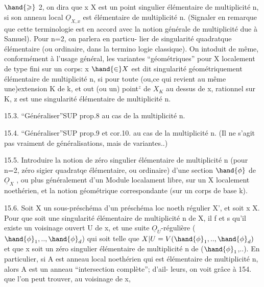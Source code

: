 
$\hand{\geqslant}$ 2, on dira que x \hand{$\in$} X est un point singulier élémentaire de multiplicité
n, si son anneau local $\underline{O}_{X,x}$ est élémentaire de multiplicité n. (Signaler
en remarque que cette  terminologie est en accord avec la notion
générale de multiplicité due à Samuel). Pour n=2, on parlera en particu-%
lier de singularité quadratque élémentaire (ou ordinaire, dans la termino
logie classique). On intoduit de même, conformément à l'usage général,
les variantes ``géométriques'' pour X localement de type fini sur un corps:
x $\hand{\in} X$ est dit singularité géométriquement élémentaire de multiplicité n, si
pour toute (ou,ce qui revient au même\unsure{,} une)extension K de k, et out
(ou un) point$^{z}$ de $X_{K}$ au dessus de x, rationnel sur K, z est une
singularité élémentaire de multiplicité n.

15.3. ``Généraliser''SUP prop.8 au cas de la multiplicité n.

15.4. ``Généraliser''SUP prop.9 et cor.10. au cas de la multiplicité n.
(Il ne s'agit pas vraiment de généralisations, mais de variantes..)

15.5. Introduire la notion de zéro singulier élémentaire de multiplicité
n (pour n=2, zéro sigier quadratqe élémentaire, ou ordinaire) d'une
section $\hand{\phi}$ de $\underline{O}_{X}$ , ou plus généralement d'un Module localament libre, sur
un X localement noethérien, et la notion géométrique correspondante
(sur un corps de base k).

15.6. Soit X un sous-préschéma d'un préschéma loc noeth régulier X', et
soit x \hand{$\in$}X. Pour que  soit une singularité élémentaire de multiplicité
n de X, il f et s qu'il existe un voisinage ouvert U de x, et une
suite $\underline{O}_{U}$-régulière ($\hand{\phi}_{1},..,\hand{\phi}_{d}$) qui soit telle que $X|U = V(\hand{\phi}_{1},..,\hand{\phi}_{d})$ et
que x soit un zéro singulier élémentaire de multiplicité n de ($\hand{\phi}_{1}$,..).
En particulier, si A est anneau local noethérien qui est élémentaire
\placedmargin{$\Vert$} de multiplicité n, alors A est un anneau ``intersection complète''; d'ail-%
leurs, on voit grâce à 154. que l'on peut trouver, au voisinage de x,

